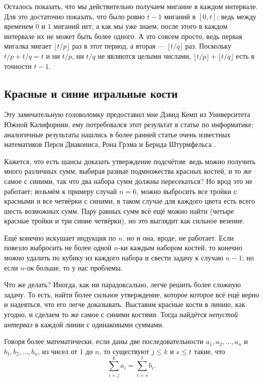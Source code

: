 Осталось показать, что мы действительно получаем мигание в каждом интервале.
Для это достаточно показать, что было ровно $t - 1$ миганий в $[0,t]$;
ведь между временем $0$ и $1$ миганий нет, а как мы уже знаем, после этого в каждом интервале их не может быть более одного.
А это совсем просто, ведь первая мигалка мигает $\lfloor t/p\rfloor$ раз в этот период, а вторая --- $\lfloor t/q\rfloor$ раз.
Поскольку $t/p + t/q = t$ и ни $t/p$, ни $t/q$ не являются целыми числами, $\lfloor t/p\rfloor + \lfloor t/q\rfloor$ есть в точности $t - 1$.

\subsection*{Красные и синие игральные кости}

Эту замечательную головоломку предоставил мне Дэвид Кемп из Университета Южной Калифорнии, ему потребовался этот результат в статье по информатике;
аналогичные результаты нашлись в более ранней статье очень известных математиков Перси Диакониса, Рона Грэма и Бернда Штурмфельса \cite{diaconis-graham-sturmfels}.

Кажется, что есть шансы доказать утверждение подсчётом: ведь можно получить много различных сумм, выбирая разные подмножества красных костей, и то же самое с синими, так что два набора сумм должны пересекаться?
Но врод это не работает;
возьмём к примеру случай $n = 6$,  можно выбросить все тройки с красными и все четвёрки с синими, в таком случае для каждого цвета есть всего шесть возможных сумм.
Пару равных сумм всё ещё можно найти (четыре красные тройки и три синие четвёрки), но это выглядит как сильное везение.

Ещё конечно искушает индукция по $n$, но и она, вроде, не работает.
Если повезло выбросить не более одной $n$-ки каждым набором костей,
то конечно можно удалить по кубику из каждого набора и свести задачу к случаю $n-1$;
но если $n$-ок больше, то у нас проблемы.

Что же делать?
Иногда, как ни парадоксально, легче решить более сложную задачу.
То есть, найти более сильное утверждение, которое которое всё ещё верно и надеяться, что его легче доказывать.
Выставим красные кости в линию, как угодно, и сделаем то же самое с синими костями.
Тогда найдётся \emph{непустой интервал} в каждой линии с одинаковыми суммами.

Говоря более математически, если даны две последовательности $a_1,a_2,\dots,a_n$ и $b_1,b_2,\dots,b_n$, из чисел от $1$ до $n$, то существуют 
$j\le k$ и 
$s\le t$ такие, что 
\[\sum_{i=j}^ka_i=\sum_{i=s}^tb_i.\]

